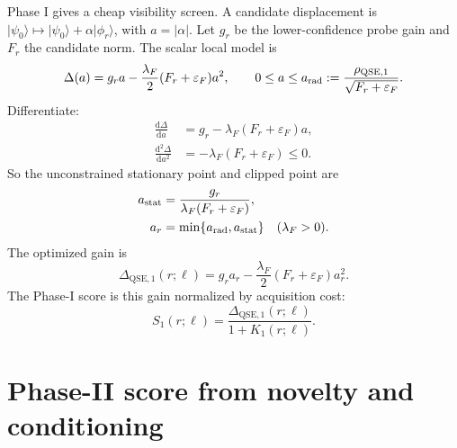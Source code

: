 \documentclass[10pt,twocolumn]{article}
\newcommand{\qse}{\mathrm{QSE}}
\newcommand{\eps}{\varepsilon}
\newcommand{\dd}{\mathrm d}
\newcommand{\ket}[1]{\lvert #1\rangle}
\begin{document}
Phase I gives a cheap visibility screen. A candidate displacement is \(\ket{\psi_0}\mapsto\ket{\psi_0}+\alpha\ket{\phi_r}\), with \(a=|\alpha|\). Let \(g_r\) be the lower-confidence probe gain and \(F_r\) the candidate norm. The scalar local model is
\begin{equation}
\Delta(a)=g_ra-\frac{\lambda_F}{2}(F_r+\eps_F)a^2,
\qquad
0\le a\le a_{\rm rad}:=\frac{\rho_{\qse,1}}{\sqrt{F_r+\eps_F}}.
\label{eq:phase1_model}
\end{equation}
Differentiate:
\begin{equation}
\begin{aligned}
\frac{\dd\Delta}{\dd a}
&=g_r-\lambda_F(F_r+\eps_F)a,\\
\frac{\dd^2\Delta}{\dd a^2}
&=-\lambda_F(F_r+\eps_F)\le0.
\end{aligned}
\label{eq:phase1_derivs}
\end{equation}
So the unconstrained stationary point and clipped point are
\begin{equation}
\begin{aligned}
a_{\rm stat}&=\frac{g_r}{\lambda_F(F_r+\eps_F)},\\
a_r&=\min\{a_{\rm rad},a_{\rm stat}\}
\quad(\lambda_F>0).
\end{aligned}
\label{eq:phase1_clip}
\end{equation}
The optimized gain is
\begin{equation}
\Delta_{\qse,1}(r;\ell)=g_ra_r-\frac{\lambda_F}{2}(F_r+\eps_F)a_r^2.
\label{eq:phase1_gain}
\end{equation}
The Phase-I score is this gain normalized by acquisition cost:
\begin{equation}
S_1(r;\ell)=\frac{\Delta_{\qse,1}(r;\ell)}{1+K_1(r;\ell)}.
\label{eq:S1}
\end{equation}

\section{Phase-II score from novelty and conditioning}
\end{document}
